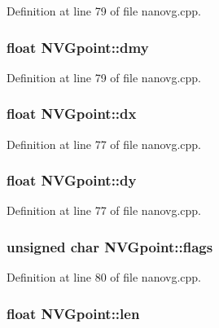 Definition at line 79 of file nanovg.\+cpp.

\hypertarget{struct_n_v_gpoint_aed3b812230172a44e00d8f305b2fc3bc}{
\subsubsection[{dmy}]{\setlength{\rightskip}{0pt plus 5cm}float N\+V\+Gpoint\+::dmy}}\label{struct_n_v_gpoint_aed3b812230172a44e00d8f305b2fc3bc}


Definition at line 79 of file nanovg.\+cpp.

\hypertarget{struct_n_v_gpoint_a05a14d0cf2609a3aad0090d1eb90b1f2}{
\subsubsection[{dx}]{\setlength{\rightskip}{0pt plus 5cm}float N\+V\+Gpoint\+::dx}}\label{struct_n_v_gpoint_a05a14d0cf2609a3aad0090d1eb90b1f2}


Definition at line 77 of file nanovg.\+cpp.

\hypertarget{struct_n_v_gpoint_a3b77b6c1575026fd69f764bf30207a3a}{
\subsubsection[{dy}]{\setlength{\rightskip}{0pt plus 5cm}float N\+V\+Gpoint\+::dy}}\label{struct_n_v_gpoint_a3b77b6c1575026fd69f764bf30207a3a}


Definition at line 77 of file nanovg.\+cpp.

\hypertarget{struct_n_v_gpoint_a0df9b61eba4d68d5ec44ccbfe78b7bf0}{
\subsubsection[{flags}]{\setlength{\rightskip}{0pt plus 5cm}unsigned char N\+V\+Gpoint\+::flags}}\label{struct_n_v_gpoint_a0df9b61eba4d68d5ec44ccbfe78b7bf0}


Definition at line 80 of file nanovg.\+cpp.

\hypertarget{struct_n_v_gpoint_a6224808e39e30ade508d7abb819a2600}{
\subsubsection[{len}]{\setlength{\rightskip}{0pt plus 5cm}float N\+V\+Gpoint\+::len}}\label{struct_n_v_gpoint_a6224808e39e30ade508d7abb819a2600}


